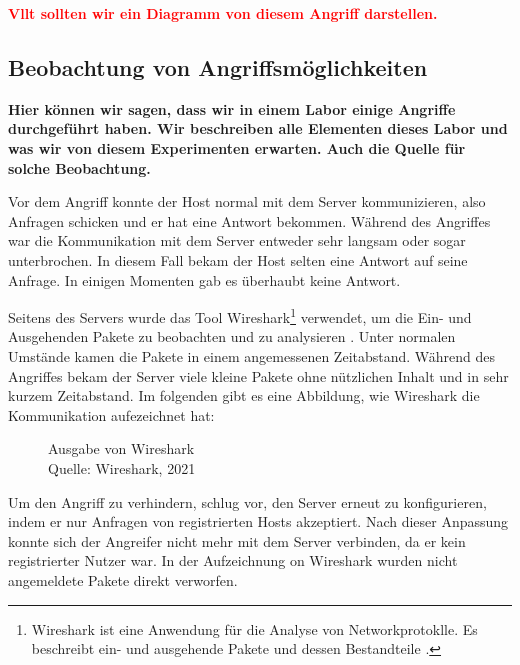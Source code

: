 \textcolor{red}{\textbf{Vllt sollten wir ein Diagramm von diesem Angriff darstellen.}}


\subsection{Beobachtung von Angriffsmöglichkeiten}
\textbf{Hier können wir sagen, dass wir in einem Labor einige Angriffe durchgeführt haben. Wir beschreiben alle Elementen
dieses Labor und was wir von diesem Experimenten erwarten. Auch die Quelle für solche Beobachtung.}

Vor dem Angriff konnte der Host normal mit dem Server kommunizieren, also Anfragen schicken und er hat eine Antwort bekommen.
Während des Angriffes war die Kommunikation mit dem Server entweder sehr langsam oder sogar unterbrochen. In diesem Fall
bekam der Host selten eine Antwort auf seine Anfrage. In einigen Momenten gab es überhaubt keine Antwort. 

Seitens des Servers wurde das Tool Wireshark\footnote{Wireshark ist eine Anwendung für die Analyse von Networkprotoklle.
Es beschreibt ein- und ausgehende Pakete und dessen Bestandteile \cite{refst:wisa}.} verwendet, um die Ein- und Ausgehenden
Pakete zu beobachten und zu analysieren \cite{refart:UBEC}. Unter normalen Umstände kamen die Pakete in einem angemessenen
Zeitabstand. Während des Angriffes bekam der Server viele kleine Pakete ohne nützlichen Inhalt und in sehr kurzem Zeitabstand.
Im folgenden gibt es eine Abbildung, wie Wireshark die Kommunikation aufezeichnet hat:

\begin{figure}[H]
  \caption{Ausgabe von Wireshark \\Quelle: Wireshark, 2021}
  \label{fig:refst_wisa}
\end{figure}

Um den Angriff zu verhindern, schlug \cite{refip:NYRS} vor, den Server erneut zu konfigurieren, indem er 
nur Anfragen von registrierten Hosts akzeptiert. Nach dieser Anpassung konnte sich der Angreifer nicht 
mehr mit dem Server verbinden, da er kein registrierter Nutzer war. In der Aufzeichnung on Wireshark wurden
nicht angemeldete Pakete direkt verworfen.

